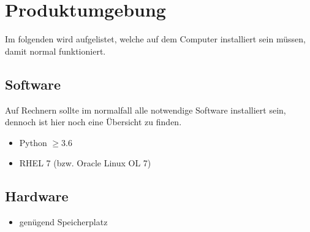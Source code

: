 \chapter{Produktumgebung}
Im folgenden wird aufgelistet, welche  auf dem Computer installiert sein müssen, damit \e  normal funktioniert.\\

\section{Software}
Auf Rechnern sollte im normalfall alle notwendige Software installiert sein, dennoch ist hier noch eine Übersicht zu finden.

\begin{itemize}
	\item Python $ \geq 3.6$
	\item RHEL 7 (bzw. Oracle Linux OL 7)
\end{itemize}

\section{Hardware}
\begin{itemize}
	\item genügend Speicherplatz
\end{itemize}

